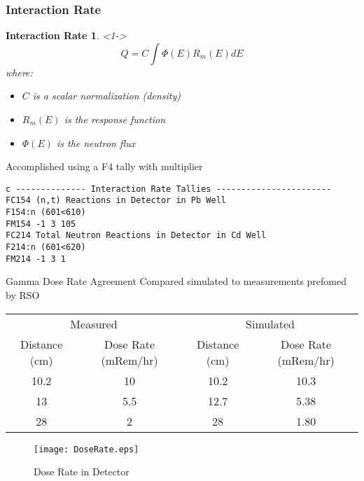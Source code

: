 \begin{frame}[fragile]
\frametitle{Interaction Rate}
	\tiny
	\newtheorem{MCNPXModelTHM11}{Interaction Rate}
	\begin{MCNPXModelTHM11}<1->
		$$Q = C \int {\Phi(E) R_m(E) dE }$$
	where:
	\begin{itemize}
		\item $C$ is a scalar normalization (density)
		\item $R_m(E)$ is the response function
		\item $\Phi(E)$ is the neutron flux
	\end{itemize}
	\end{MCNPXModelTHM11}
Accomplished using a F4 tally with multiplier
\tiny
\begin{lstlisting}
c -------------- Interaction Rate Tallies -----------------------
FC154 (n,t) Reactions in Detector in Pb Well
F154:n (601<610)
FM154 -1 3 105
FC214 Total Neutron Reactions in Detector in Cd Well
F214:n (601<620)
FM214 -1 3 1
\end{lstlisting}
\hyperlink{MCNPXMain}{}
\hyperlink{toc}{}
\end{frame}
\begin{frame}{Gamma Dose Rate Agreement}
\small
Compared simulated to measurements prefomed by RSO
	\begin{table}[h]
		\tiny
		\begin{tabular}{c c | c c}
        \multicolumn{2}{c}{Measured} & \multicolumn{2}{c}{Simulated} \\
        Distance (cm) & Dose Rate (mRem/hr) & Distance (cm) & Dose Rate (mRem/hr) \\
		\hline
		\hline
        10.2 & 10 & 10.2 & 10.3 \\
        13 & 5.5 & 12.7 & 5.38 \\
        28 & 2 & 28 & 1.80 \\
		\end{tabular}
	\end{table}
	\centering
	\begin{figure}
		\texttt{[image: DoseRate.eps]}
		\caption{Dose Rate in Detector}
	\end{figure}
\hyperlink{MCNPXMain}{}
\hyperlink{toc}{}
\end{frame}
